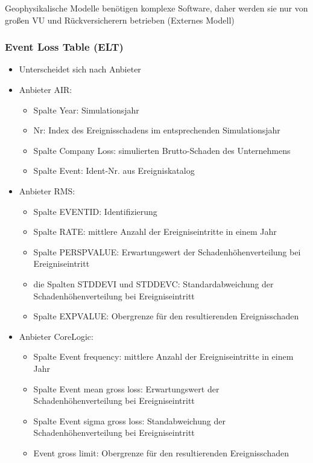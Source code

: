 \documentclass[12pt]{report}
\theoremstyle{dotless}
\theoremstyle{definition}
\begin{document}
Geophysikalische Modelle benötigen komplexe Software, daher werden sie nur von großen VU und Rückversicherern betrieben (Externes Modell)


\subsubsection{Event Loss Table (ELT)}
\begin{itemize}
\item Unterscheidet sich nach Anbieter
\item Anbieter AIR:
\begin{itemize}
\item Spalte Year: Simulationsjahr
\item Nr: Index des Ereignisschadens im entsprechenden Simulationsjahr
\item Spalte Company Loss: simulierten Brutto-Schaden des Unternehmens
\item Spalte Event: Ident-Nr. aus Ereigniskatalog
\end{itemize}
\item Anbieter RMS:
\begin{itemize}
\item Spalte EVENTID: Identifizierung
\item Spalte RATE: mittlere Anzahl der Ereigniseintritte in einem Jahr
\item Spalte PERSPVALUE: Erwartungswert der Schadenhöhenverteilung bei Ereigniseintritt
\item die Spalten STDDEVI und STDDEVC: Standardabweichung der Schadenhöhenverteilung bei Ereigniseintritt
\item Spalte EXPVALUE: Obergrenze für den resultierenden Ereignisschaden
\end{itemize}
\item Anbieter CoreLogic:
\begin{itemize}
\item Spalte Event frequency: mittlere Anzahl der Ereigniseintritte in einem Jahr
\item  Spalte Event mean gross loss: Erwartungswert der Schadenhöhenverteilung bei
Ereigniseintritt
\item Spalte Event sigma gross loss: Standabweichung der Schadenhöhenverteilung bei
Ereigniseintritt
\item Event gross limit: Obergrenze für den resultierenden Ereignisschaden
\end{itemize}
\end{itemize}
\end{document}
